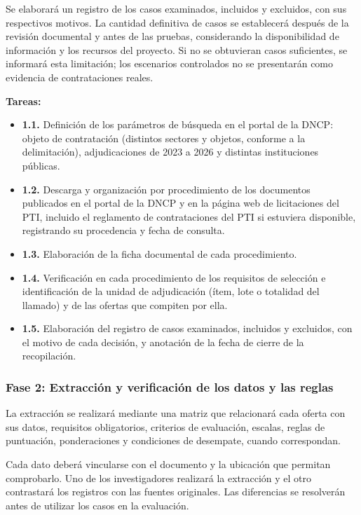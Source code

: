 \documentclass[12pt,a4paper]{article}
\begin{document}
Se elaborará un registro de los casos examinados, incluidos y excluidos, con sus respectivos motivos. La cantidad definitiva de casos se establecerá después de la revisión documental y antes de las pruebas, considerando la disponibilidad de información y los recursos del proyecto. Si no se obtuvieran casos suficientes, se informará esta limitación; los escenarios controlados no se presentarán como evidencia de contrataciones reales.

\textbf{Tareas:}

\begin{itemize}
\item \textbf{1.1.} Definición de los parámetros de búsqueda en el portal de la DNCP: objeto de contratación (distintos sectores y objetos, conforme a la delimitación), adjudicaciones de 2023 a 2026 y distintas instituciones públicas.
\item \textbf{1.2.} Descarga y organización por procedimiento de los documentos publicados en el portal de la DNCP y en la página web de licitaciones del PTI, incluido el reglamento de contrataciones del PTI si estuviera disponible, registrando su procedencia y fecha de consulta.
\item \textbf{1.3.} Elaboración de la ficha documental de cada procedimiento.
\item \textbf{1.4.} Verificación en cada procedimiento de los requisitos de selección e identificación de la unidad de adjudicación (ítem, lote o totalidad del llamado) y de las ofertas que compiten por ella.
\item \textbf{1.5.} Elaboración del registro de casos examinados, incluidos y excluidos, con el motivo de cada decisión, y anotación de la fecha de cierre de la recopilación.
\end{itemize}

\subsubsection{Fase 2: Extracción y verificación de los datos y las reglas}

La extracción se realizará mediante una matriz que relacionará cada oferta con sus datos, requisitos obligatorios, criterios de evaluación, escalas, reglas de puntuación, ponderaciones y condiciones de desempate, cuando correspondan.

Cada dato deberá vincularse con el documento y la ubicación que permitan comprobarlo. Uno de los investigadores realizará la extracción y el otro contrastará los registros con las fuentes originales. Las diferencias se resolverán antes de utilizar los casos en la evaluación.
\end{document}
